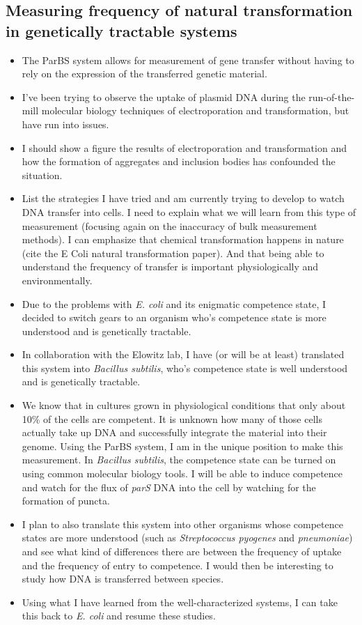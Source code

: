 \subsection*{Measuring frequency of natural transformation in genetically
tractable systems}
\begin{itemize}
	\item The ParBS system allows for measurement of gene transfer without
		having to rely on the expression of the transferred genetic material.
	\item I've been trying to observe the uptake of plasmid DNA during the
		run-of-the-mill molecular biology techniques of electroporation
		and transformation, but have run into issues. 
	\item I should show a figure the results of electroporation and
		transformation and how the formation of aggregates and inclusion
		bodies has confounded the situation. 
	\item List the strategies I have tried and am currently trying to
		develop to watch DNA transfer into cells. I need to explain what
		we will learn from this type of measurement (focusing again on
		the inaccuracy of bulk measurement methods). I can emphasize
		that chemical transformation happens in nature (cite the E Coli
		natural transformation paper). And that being able to understand
		the frequency of transfer is important physiologically and
		environmentally. 
	\item Due to the problems with \textit{E. coli} and its enigmatic
		competence state, I decided to switch gears to an organism who's
		competence state is more understood and is genetically
		tractable. 
	\item In collaboration with the Elowitz lab, I have (or will be at
		least) translated this system into \textit{Bacillus subtilis},
		who's competence state is well understood and is genetically
		tractable. 
	\item We know that in cultures grown in physiological conditions that
		only about 10\% of the cells are competent.  It is unknown how
		many of those cells actually take up DNA and successfully
		integrate the material into their genome. Using the ParBS
		system,  I am in the unique position to make this measurement.
		In \textit{Bacillus subtilis}, the competence state can be
		turned on using common molecular biology tools. I will be able
		to induce competence and watch for the flux of \textit{parS} DNA
		into the cell by watching for the formation of puncta. 
	\item I plan to also translate this system into other organisms whose
		competence states are more understood (such as
		\textit{Streptococcus pyogenes} and \textit{pneumoniae}) and see
		what kind of differences there are between the frequency of
		uptake and the frequency of entry to competence. I would then be
		interesting to study how DNA is transferred between species.
	\item Using what I have learned from the well-characterized systems, I
		can take this back to \textit{E. coli} and resume these studies.
\end{itemize}

